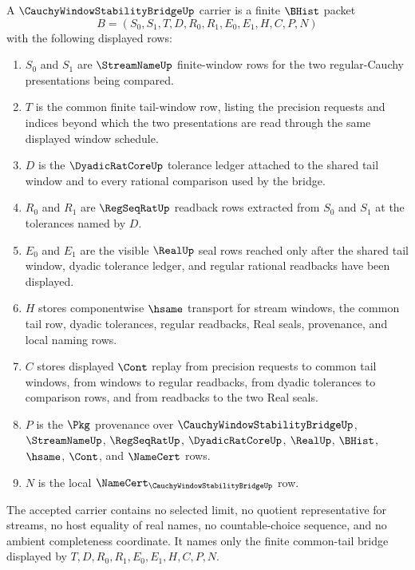 \begin{definition}
\label{def:cauchy-window-stability-bridge-carrier}
A $\CauchyWindowStabilityBridgeUp$ carrier is a finite $\BHist$ packet
$$
B=(S_0,S_1,T,D,R_0,R_1,E_0,E_1,H,C,P,N)
$$
with the following displayed rows:
\begin{enumerate}
\item $S_0$ and $S_1$ are $\StreamNameUp$ finite-window rows for the two regular-Cauchy presentations being compared.
\item $T$ is the common finite tail-window row, listing the precision requests and indices beyond which the two presentations are read through the same displayed window schedule.
\item $D$ is the $\DyadicRatCoreUp$ tolerance ledger attached to the shared tail window and to every rational comparison used by the bridge.
\item $R_0$ and $R_1$ are $\RegSeqRatUp$ readback rows extracted from $S_0$ and $S_1$ at the tolerances named by $D$.
\item $E_0$ and $E_1$ are the visible $\RealUp$ seal rows reached only after the shared tail window, dyadic tolerance ledger, and regular rational readbacks have been displayed.
\item $H$ stores componentwise $\hsame$ transport for stream windows, the common tail row, dyadic tolerances, regular readbacks, Real seals, provenance, and local naming rows.
\item $C$ stores displayed $\Cont$ replay from precision requests to common tail windows, from windows to regular readbacks, from dyadic tolerances to comparison rows, and from readbacks to the two Real seals.
\item $P$ is the $\Pkg$ provenance over $\CauchyWindowStabilityBridgeUp$, $\StreamNameUp$, $\RegSeqRatUp$, $\DyadicRatCoreUp$, $\RealUp$, $\BHist$, $\hsame$, $\Cont$, and $\NameCert$ rows.
\item $N$ is the local $\NameCert_{\CauchyWindowStabilityBridgeUp}$ row.
\end{enumerate}
The accepted carrier contains no selected limit, no quotient representative for streams, no host equality of real names, no countable-choice sequence, and no ambient completeness coordinate. It names only the finite common-tail bridge displayed by $T,D,R_0,R_1,E_0,E_1,H,C,P,N$.
\end{definition}

